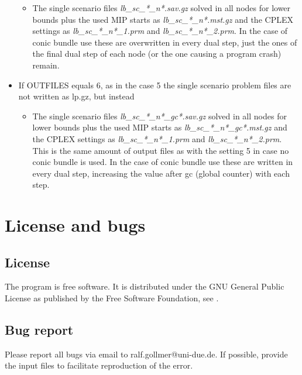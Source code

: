 \documentclass[11pt,draft]{article}
\newcommand{\+}{{\ti{+}}}
\newcommand{\1}{{\ti{1}}}
\begin{document}
\begin{itemize}
\begin{itemize}
\item The single scenario files {\it lb\_sc\_*\_n*.sav.gz} solved in all nodes for lower bounds plus the used MIP starts as {\it lb\_sc\_*\_n*.mst.gz} and
 the CPLEX settings as {\it lb\_sc\_*\_n*\_1.prm} and {\it lb\_sc\_*\_n*\_2.prm}. In the case of conic bundle use these are overwritten in every dual step,
 just the ones of the final dual step of each node (or the one causing a program crash) remain.
\end{itemize}
\item If OUTFILES equals 6, as in the case 5 the single scenario problem files are not written as lp.gz, but instead
\begin{itemize}
\item The single scenario files {\it lb\_sc\_*\_n*\_gc*.sav.gz} solved in all nodes for lower bounds plus the used MIP starts as {\it lb\_sc\_*\_n*\_gc*.mst.gz} and
 the CPLEX settings as {\it lb\_sc\_*\_n*\_1.prm} and {\it lb\_sc\_*\_n*\_2.prm}.
 This is the same amount of output files as with the setting 5 in case no conic bundle is used.
 In the case of conic bundle use these are written in every dual step, increasing the value after gc (global counter) with each step.
\end{itemize}
\end{itemize}
%
\section{License and bugs}
\subsection{License}
The program is free software. It is distributed under the GNU General Public License as published by
the Free Software Foundation, see \cite{gnu}.
%
\subsection{Bug report}
Please report all bugs via email to ralf.gollmer@uni-due.de. If possible, provide the input
files to facilitate reproduction of the error.
%
\end{document}
